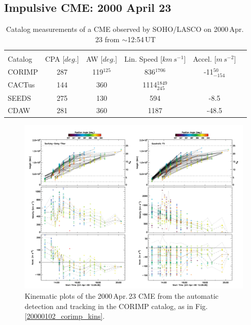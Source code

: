 \documentclass[referee,a4paper,12pt,traditabstract]{swsc}
\begin{document}
\begin{linenumbers}
\subsection{Impulsive CME: 2000 April 23}


\begin{table}[h]
\begin{tabular}{l*{4}{c}r}
\multicolumn{5}{c}{} \\
Catalog              & CPA [$deg.$] & AW [$deg.$] & Lin. Speed [$km\,s^{-1}$] & Accel. [$m\,s^{-2}$]  \\
\hline
CORIMP   & 287 & 119$^{125}$ & 836$^{1706}$ & -11$_{-154}^{50}$       \\
CACTus  & 144 & 360 & 1114$_{245}^{1849}$ &            \\
SEEDS  & 275 & 130 & 594 & -8.5        \\
CDAW      & 281 & 360 & 1187 & -48.5 \\
\end{tabular}
\caption{Catalog measurements of a CME observed by SOHO/LASCO on 2000\,Apr.\,23 from $\sim$12:54\,UT}
\label{table_20000423}
\end{table}

\begin{figure}[t]
\centerline{\includegraphics[width=\linewidth]{images/20000423_corimp_kins.pdf}}
\caption{Kinematic plots of the 2000\,Apr.\,23 CME from the automatic detection and tracking in the CORIMP catalog, as in Fig.\,\ref{20000102_corimp_kins}.}
\label{20000423_corimp_kins}
\end{figure}



\end{linenumbers}
\end{document}
